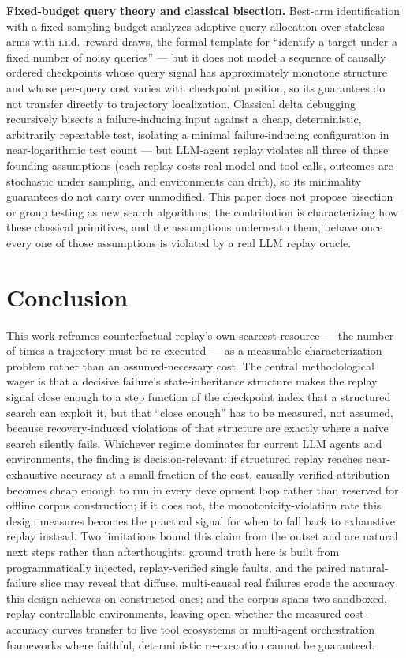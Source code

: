 \documentclass[11pt]{article}
\begin{document}
\textbf{Fixed-budget query theory and classical bisection.} Best-arm identification with a fixed sampling budget \citep{BAILD2025} analyzes adaptive query allocation over stateless arms with i.i.d.\ reward draws, the formal template for ``identify a target under a fixed number of noisy queries'' --- but it does not model a sequence of causally ordered checkpoints whose query signal has approximately monotone structure and whose per-query cost varies with checkpoint position, so its guarantees do not transfer directly to trajectory localization. Classical delta debugging \citep{ZellerHildebrandt2002} recursively bisects a failure-inducing input against a cheap, deterministic, arbitrarily repeatable test, isolating a minimal failure-inducing configuration in near-logarithmic test count --- but LLM-agent replay violates all three of those founding assumptions (each replay costs real model and tool calls, outcomes are stochastic under sampling, and environments can drift), so its minimality guarantees do not carry over unmodified. This paper does not propose bisection or group testing as new search algorithms; the contribution is characterizing how these classical primitives, and the assumptions underneath them, behave once every one of those assumptions is violated by a real LLM replay oracle.

\section{Conclusion}

This work reframes counterfactual replay's own scarcest resource --- the number of times a trajectory must be re-executed --- as a measurable characterization problem rather than an assumed-necessary cost. The central methodological wager is that a decisive failure's state-inheritance structure makes the replay signal close enough to a step function of the checkpoint index that a structured search can exploit it, but that ``close enough'' has to be measured, not assumed, because recovery-induced violations of that structure are exactly where a naive search silently fails. Whichever regime dominates for current LLM agents and environments, the finding is decision-relevant: if structured replay reaches near-exhaustive accuracy at a small fraction of the cost, causally verified attribution becomes cheap enough to run in every development loop rather than reserved for offline corpus construction; if it does not, the monotonicity-violation rate this design measures becomes the practical signal for when to fall back to exhaustive replay instead. Two limitations bound this claim from the outset and are natural next steps rather than afterthoughts: ground truth here is built from programmatically injected, replay-verified single faults, and the paired natural-failure slice may reveal that diffuse, multi-causal real failures erode the accuracy this design achieves on constructed ones; and the corpus spans two sandboxed, replay-controllable environments, leaving open whether the measured cost-accuracy curves transfer to live tool ecosystems or multi-agent orchestration frameworks where faithful, deterministic re-execution cannot be guaranteed.
\end{document}

